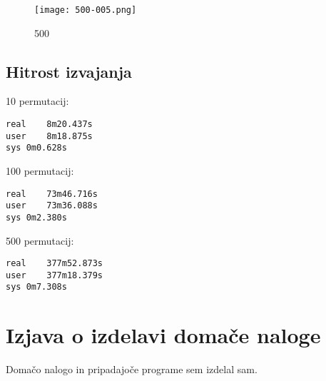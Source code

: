 \documentclass[a4paper,11pt]{article}
\begin{document}
\begin{figure}[H]
\begin{center}
\texttt{[image: 500-005.png]}
\caption{500}
\label{primeri4}
\end{center}
\end{figure}

\subsection{Hitrost izvajanja}
10 permutacij:
\begin{verbatim}
real	8m20.437s
user	8m18.875s
sys	0m0.628s
\end{verbatim}
100 permutacij:
\begin{verbatim}
real	73m46.716s
user	73m36.088s
sys	0m2.380s

\end{verbatim}
500 permutacij:
\begin{verbatim}
real	377m52.873s
user	377m18.379s
sys	0m7.308s
\end{verbatim}


\section{Izjava o izdelavi domače naloge}
Domačo nalogo in pripadajoče programe sem izdelal sam.
\end{document}
